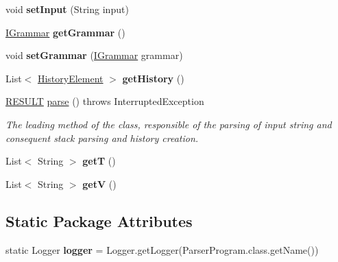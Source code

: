 \begin{DoxyCompactItemize}
\item 
\hypertarget{classparser_program_1_1_parser_program_a5db0b2d0b34c93fcd9cb06e0f3a75fbf}{void {\bfseries set\-Input} (String input)}\label{classparser_program_1_1_parser_program_a5db0b2d0b34c93fcd9cb06e0f3a75fbf}

\item 
\hypertarget{classparser_program_1_1_parser_program_a27f0e5e4b6be9950dc586832f7d20fc8}{\hyperlink{interfacecontext_free_1_1grammar_1_1_i_grammar}{I\-Grammar} {\bfseries get\-Grammar} ()}\label{classparser_program_1_1_parser_program_a27f0e5e4b6be9950dc586832f7d20fc8}

\item 
\hypertarget{classparser_program_1_1_parser_program_a8174d65b7fd5e3aca2dbe48ec1582700}{void {\bfseries set\-Grammar} (\hyperlink{interfacecontext_free_1_1grammar_1_1_i_grammar}{I\-Grammar} grammar)}\label{classparser_program_1_1_parser_program_a8174d65b7fd5e3aca2dbe48ec1582700}

\item 
\hypertarget{classparser_program_1_1_parser_program_ade596abd5eb6e01c6be4e9da8d71b39d}{List$<$ \hyperlink{classparser_program_1_1_history_element}{History\-Element} $>$ {\bfseries get\-History} ()}\label{classparser_program_1_1_parser_program_ade596abd5eb6e01c6be4e9da8d71b39d}

\item 
\hyperlink{enumparser_program_1_1_r_e_s_u_l_t}{R\-E\-S\-U\-L\-T} \hyperlink{classparser_program_1_1_parser_program_ac8e01a54887a9c9f0a9d277d5cbb0c61}{parse} ()  throws Interrupted\-Exception
\begin{DoxyCompactList}\small\item\em The leading method of the class, responsible of the parsing of input string and consequent stack parsing and history creation. \end{DoxyCompactList}\item 
\hypertarget{classparser_program_1_1_parser_program_a8a5d6d764dffb841c4eb2e0ba7e8a831}{List$<$ String $>$ {\bfseries get\-T} ()}\label{classparser_program_1_1_parser_program_a8a5d6d764dffb841c4eb2e0ba7e8a831}

\item 
\hypertarget{classparser_program_1_1_parser_program_a2069ee9c4e2c9e5b842e6480ceda50e8}{List$<$ String $>$ {\bfseries get\-V} ()}\label{classparser_program_1_1_parser_program_a2069ee9c4e2c9e5b842e6480ceda50e8}

\end{DoxyCompactItemize}
\subsection*{Static Package Attributes}
\begin{DoxyCompactItemize}
\item 
\hypertarget{classparser_program_1_1_parser_program_a345c2f7b22b455b824b68058e2dc1a83}{static Logger {\bfseries logger} = Logger.\-get\-Logger(Parser\-Program.\-class.\-get\-Name())}\label{classparser_program_1_1_parser_program_a345c2f7b22b455b824b68058e2dc1a83}

\end{DoxyCompactItemize}

